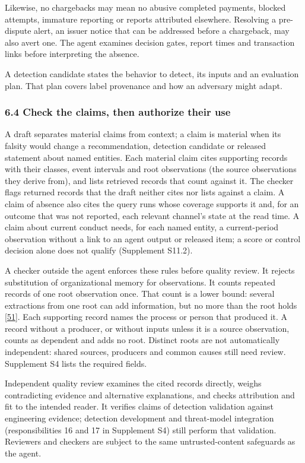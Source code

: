 \documentclass[
  11pt,
]{article}
\begin{document}
Likewise, no chargebacks may mean no abusive completed payments, blocked
attempts, immature reporting or reports attributed elsewhere. Resolving
a pre-dispute alert, an issuer notice that can be addressed before a
chargeback, may also avert one. The agent examines decision gates,
report times and transaction links before interpreting the absence.

A detection candidate states the behavior to detect, its inputs and an
evaluation plan. That plan covers label provenance and how an adversary
might adapt.

\hypertarget{check-the-claims-then-authorize-their-use}{%
\subsubsection{6.4 Check the claims, then authorize their
use}\label{check-the-claims-then-authorize-their-use}}

A draft separates material claims from context; a claim is material when
its falsity would change a recommendation, detection candidate or
released statement about named entities. Each material claim cites
supporting records with their classes, event intervals and root
observations (the source observations they derive from), and lists
retrieved records that count against it. The checker flags returned
records that the draft neither cites nor lists against a claim. A claim
of absence also cites the query runs whose coverage supports it and, for
an outcome that was not reported, each relevant channel's state at the
read time. A claim about current conduct needs, for each named entity, a
current-period observation without a link to an agent output or released
item; a score or control decision alone does not qualify (Supplement
S11.2).

A checker outside the agent enforces these rules before quality review.
It rejects substitution of organizational memory for observations. It
counts repeated records of one root observation once. That count is a
lower bound: several extractions from one root can add information, but
no more than the root holds
{[}\protect\hyperlink{ref-Bara2026EpistemicSybil}{51}{]}. Each
supporting record names the process or person that produced it. A record
without a producer, or without inputs unless it is a source observation,
counts as dependent and adds no root. Distinct roots are not
automatically independent: shared sources, producers and common causes
still need review. Supplement S4 lists the required fields.

Independent quality review examines the cited records directly, weighs
contradicting evidence and alternative explanations, and checks
attribution and fit to the intended reader. It verifies claims of
detection validation against engineering evidence; detection development
and threat-model integration (responsibilities 16 and 17 in Supplement
S4) still perform that validation. Reviewers and checkers are subject to
the same untrusted-content safeguards as the agent.
\end{document}
